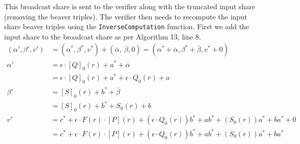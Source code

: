\documentclass[twoside,11pt,openright]{report}
\begin{document}
This broadcast share is sent to the verifier along with the truncated input share (removing the beaver triples). The verifier then needs to recompute the input share beaver triples using the \texttt{InverseComputation} function. First we add the input share to the broadcast share as per Algorithm 13, line 8.
\begin{align*}
  (\alpha', \beta', v') & = (\alpha^*, \beta^*, v^*) + (\overline{\alpha},\ \overline{\beta}, 0)  = (\alpha^* + \overline{\alpha}, \beta^* + \overline{\beta}, v^* + 0) \\
  \alpha'               & = \epsilon \cdot {[Q]}_0(r) + a^* + \overline{\alpha}                                                                                         \\
                        & = \epsilon \cdot {[Q]}_0(r) + a^* + \epsilon \cdot Q_0(r) + a                                                                                 \\
  \beta'                & = {[S]}_0(r) + b^* + \overline{\beta}                                                                                                         \\
                        & = {[S]}_0(r) + b^* + S_0(r)  + b                                                                                                              \\
  v'                    & = c^* + \epsilon \cdot F(r) \cdot [P](r) + (\epsilon \cdot Q_0(r))b^* + ab^* + (S_0(r))a^* + ba^* + 0                                         \\
                        & = c^* + \epsilon \cdot F(r) \cdot [P](r) + (\epsilon \cdot Q_0(r))b^* + ab^* + (S_0(r))a^* + ba^*                                             \\
\end{align*}
\end{document}
